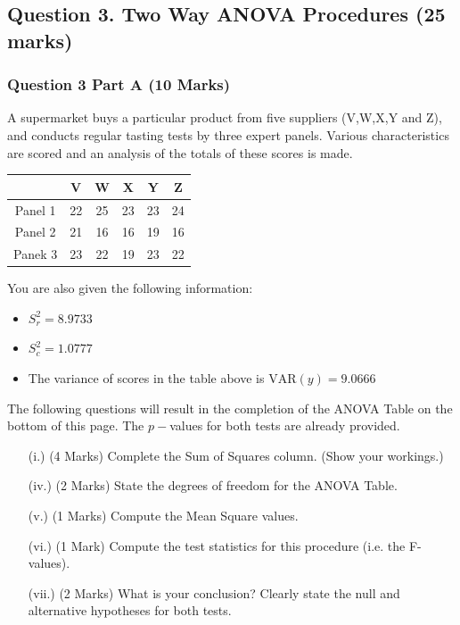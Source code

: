 \documentclass[a4paper,12pt]{article}
\begin{document}
\newpage

\subsection*{Question 3. Two Way ANOVA Procedures (25 marks) }
\subsubsection*{Question 3 Part A (10 Marks)}
A supermarket buys a particular product from five suppliers (V,W,X,Y and Z), and conducts regular tasting tests by three expert panels.
Various characteristics are scored and an analysis of the totals of these scores is made. 

\begin{center}
\begin{tabular}{|c|c|c|c|c|c|}\hline 
	&	V  & W  & X & Y & Z \\ \hline
	\hline  
	
Panel 1&    22 &  25 &  23 &  23 &  24 \\ \hline
Panel 2&   21 &  16 &  16 &  19 &  16 \\ \hline
Panek 3&   23 &  22 &  19 &  23 &  22 \\ \hline
	
	\hline 
\end{tabular} 
\end{center}

\noindent You are also given the following information:
\begin{itemize}
\item $S^2_r = 8.9733$
\item $S^2_c = 1.0777$
\item The variance of scores in the table above is $\mbox{VAR}(y) = 9.0666$
\end{itemize}
\bigskip 
\noindent The following questions will result in the completion of the ANOVA Table on the bottom of this page. The $p-$values for both tests are already provided.
\begin{itemize}
	\item[(i.)](4 Marks) Complete the Sum of Squares column. (Show your workings.)
	\item[(iv.)] (2 Marks) State the degrees of freedom for the ANOVA Table.
	\item[(v.)] (1 Marks) Compute the Mean Square values.
	\item[(vi.)] (1 Mark) Compute the test statistics for this procedure (i.e. the F-values).
	\item[(vii.)] (2 Marks) What is your conclusion? Clearly state the null and alternative hypotheses for both tests.
\end{itemize}
\end{document}

